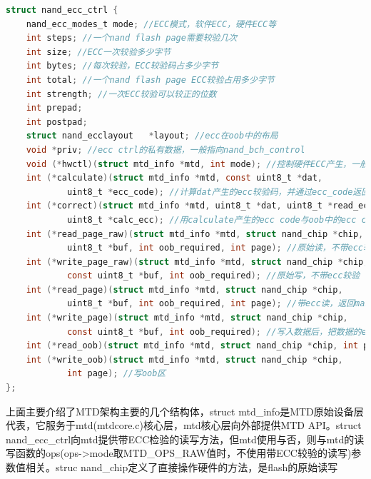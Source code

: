 \begin{lstlisting}[language=C]
struct nand_ecc_ctrl {
	nand_ecc_modes_t mode; //ECC模式，软件ECC，硬件ECC等
	int steps; //一个nand flash page需要较验几次
	int size; //ECC一次较验多少字节
	int bytes; //每次较验，ECC较验码占多少字节
	int total; //一个nand flash page ECC较验占用多少字节 
	int strength; //一次ECC较验可以较正的位数
	int prepad;
	int postpad;
	struct nand_ecclayout	*layout; //ecc在oob中的布局
	void *priv; //ecc ctrl的私有数据，一般指向nand_bch_control
	void (*hwctl)(struct mtd_info *mtd, int mode); //控制硬件ECC产生，一般是enable硬件ecc模块
	int (*calculate)(struct mtd_info *mtd, const uint8_t *dat,
			uint8_t *ecc_code); //计算dat产生的ecc较验码，并通过ecc_code返回
	int (*correct)(struct mtd_info *mtd, uint8_t *dat, uint8_t *read_ecc,
			uint8_t *calc_ecc); //用calculate产生的ecc code与oob中的ecc code进行数据较验
	int (*read_page_raw)(struct mtd_info *mtd, struct nand_chip *chip,
			uint8_t *buf, int oob_required, int page); //原始读，不带ecc较验
	int (*write_page_raw)(struct mtd_info *mtd, struct nand_chip *chip,
			const uint8_t *buf, int oob_required); //原始写，不带ecc较验
	int (*read_page)(struct mtd_info *mtd, struct nand_chip *chip,
			uint8_t *buf, int oob_required, int page); //带ecc读，返回max-bitflip
	int (*write_page)(struct mtd_info *mtd, struct nand_chip *chip,
			const uint8_t *buf, int oob_required); //写入数据后，把数据的ecc较验码也写进去
	int (*read_oob)(struct mtd_info *mtd, struct nand_chip *chip, int page); //读oob区
	int (*write_oob)(struct mtd_info *mtd, struct nand_chip *chip,
			int page); //写oob区
};

\end{lstlisting}

上面主要介绍了MTD架构主要的几个结构体，struct mtd\_info是MTD原始设备层代表，它服务于mtd(mtdcore.c)核心层，mtd核心层向外部提供MTD API。struct nand\_ecc\_ctrl向mtd提供带ECC检验的读写方法，但mtd使用与否，则与mtd的读写函数的ops(ops->mode取MTD\_OPS\_RAW值时，不使用带ECC较验的读写)参数值相关。struc nand\_chip定义了直接操作硬件的方法，是flash的原始读写

